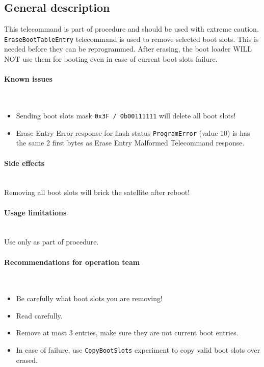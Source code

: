

\subsection{General description}
This telecommand is part of  procedure and should be used with extreme caution. \texttt{EraseBootTableEntry} telecommand is used to remove selected boot slots. This is needed before they can be reprogrammed. After erasing, the boot loader WILL NOT use them for booting even in case of current boot slots failure.

\paragraph{Known issues} \mbox{} \\
\begin{itemize}
    \item \danger Sending boot slots mask \texttt{0x3F / 0b00111111} will delete all boot slots!
    \item Erase Entry Error response for flash status \texttt{ProgramError} (value 10) is has the same 2 first bytes as Erase Entry Malformed Telecommand response.
\end{itemize}

\paragraph{Side effects} \mbox{} \\
\danger Removing all boot slots will brick the satellite after reboot!

\paragraph{Usage limitations} \mbox{} \\
Use only as part of  procedure.

\paragraph{Recommendations for operation team} \mbox{} \\
\begin{itemize}
    \item Be carefully what boot slots you are removing! 
    \item Read  carefully. 
    \item Remove at most 3 entries, make sure they are not current boot entries.
    \item In case of failure, use \texttt{CopyBootSlots} experiment to copy valid boot slots over erased.
\end{itemize}

